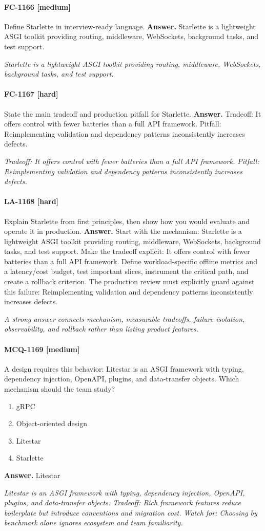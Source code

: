 \paragraph{FC-1166 [medium]} Define Starlette in interview-ready language.
\noindent\textbf{Answer.} Starlette is a lightweight ASGI toolkit providing routing, middleware, WebSockets, background tasks, and test support.
\par\textit{Starlette is a lightweight ASGI toolkit providing routing, middleware, WebSockets, background tasks, and test support.}
\paragraph{FC-1167 [hard]} State the main tradeoff and production pitfall for Starlette.
\noindent\textbf{Answer.} Tradeoff: It offers control with fewer batteries than a full API framework. Pitfall: Reimplementing validation and dependency patterns inconsistently increases defects.
\par\textit{Tradeoff: It offers control with fewer batteries than a full API framework. Pitfall: Reimplementing validation and dependency patterns inconsistently increases defects.}
\paragraph{LA-1168 [hard]} Explain Starlette from first principles, then show how you would evaluate and operate it in production.
\noindent\textbf{Answer.} Start with the mechanism: Starlette is a lightweight ASGI toolkit providing routing, middleware, WebSockets, background tasks, and test support. Make the tradeoff explicit: It offers control with fewer batteries than a full API framework. Define workload-specific offline metrics and a latency/cost budget, test important slices, instrument the critical path, and create a rollback criterion. The production review must explicitly guard against this failure: Reimplementing validation and dependency patterns inconsistently increases defects.
\par\textit{A strong answer connects mechanism, measurable tradeoffs, failure isolation, observability, and rollback rather than listing product features.}
\paragraph{MCQ-1169 [medium]} A design requires this behavior: Litestar is an ASGI framework with typing, dependency injection, OpenAPI, plugins, and data-transfer objects. Which mechanism should the team study?
\begin{enumerate}[label=\Alph*.]
\item gRPC
\item Object-oriented design
\item Litestar
\item Starlette
\end{enumerate}
\noindent\textbf{Answer.} Litestar
\par\textit{Litestar is an ASGI framework with typing, dependency injection, OpenAPI, plugins, and data-transfer objects. Tradeoff: Rich framework features reduce boilerplate but introduce conventions and migration cost. Watch for: Choosing by benchmark alone ignores ecosystem and team familiarity.}
